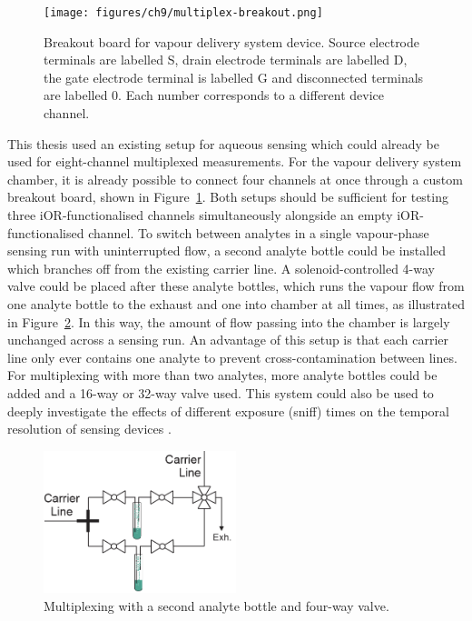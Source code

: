 \documentclass[
  a4paper,
]{scrbook}
\begin{document}
\begin{figure}

{\centering \texttt{[image: figures/ch9/multiplex-breakout.png]}

}

\caption{\label{fig-vapour-sensor-breakout}Breakout board for vapour
delivery system device. Source electrode terminals are labelled S, drain
electrode terminals are labelled D, the gate electrode terminal is
labelled G and disconnected terminals are labelled 0. Each number
corresponds to a different device channel.}

\end{figure}

This thesis used an existing setup for aqueous sensing which could
already be used for eight-channel multiplexed measurements. For the
vapour delivery system chamber, it is already possible to connect four
channels at once through a custom breakout board, shown in
Figure~\ref{fig-vapour-sensor-breakout}. Both setups should be
sufficient for testing three iOR-functionalised channels simultaneously
alongside an empty iOR-functionalised channel. To switch between
analytes in a single vapour-phase sensing run with uninterrupted flow, a
second analyte bottle could be installed which branches off from the
existing carrier line. A solenoid-controlled 4-way valve could be placed
after these analyte bottles, which runs the vapour flow from one analyte
bottle to the exhaust and one into chamber at all times, as illustrated
in Figure~\ref{fig-vapour-sensor-multiplexing}. In this way, the amount
of flow passing into the chamber is largely unchanged across a sensing
run. An advantage of this setup is that each carrier line only ever
contains one analyte to prevent cross-contamination between lines. For
multiplexing with more than two analytes, more analyte bottles could be
added and a 16-way or 32-way valve used. This system could also be used
to deeply investigate the effects of different exposure (sniff) times on
the temporal resolution of sensing devices
\autocite{Spencer2021,Wu2024}.

\begin{figure}

{\centering \includegraphics[width=0.5\textwidth,height=\textheight]{figures/ch9/multiplex-vapoursensor.png}

}

\caption{\label{fig-vapour-sensor-multiplexing}Multiplexing with a
second analyte bottle and four-way valve.}

\end{figure}
\end{document}
